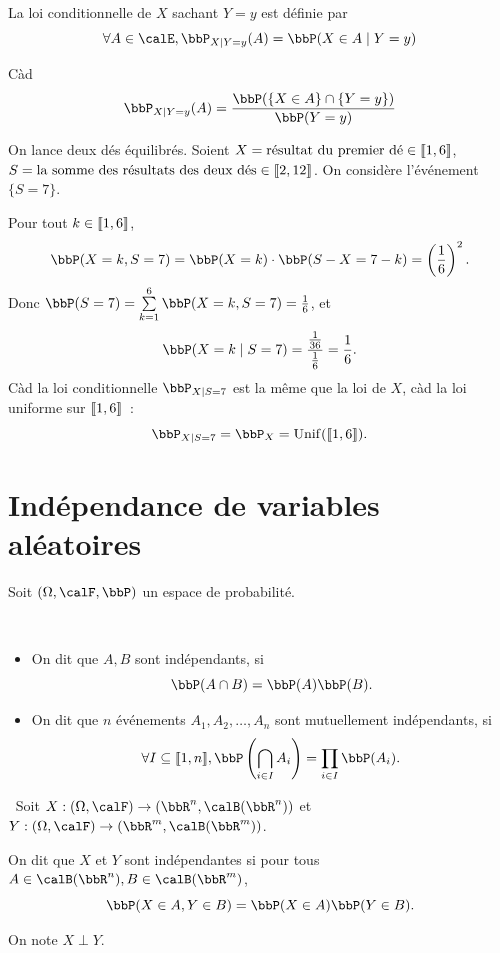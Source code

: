 \begin{deff}
    La loi conditionnelle de $X$ sachant $Y = y$ est définie par
    \[ \forall A \in \calE, \bbP_{X \mid Y = y}(A) = \bbP(X \in A \mid Y = y) \]
\end{deff}

\begin{rqq}
    Càd
    \[ \bbP_{X \mid Y = y}(A) = \frac{\bbP(\{ X \in A \} \cap \{ Y = y \})}{\bbP(Y = y)} \]
\end{rqq}

\begin{exem}
    On lance deux dés équilibrés.
    Soient $X = \text{résultat du premier dé} \in \llbracket 1, 6 \rrbracket$,
    $S = \text{la somme des résultats des deux dés} \in \llbracket 2, 12 \rrbracket$.
    On considère l'événement $\{ S = 7 \}$.

    Pour tout $k \in \llbracket 1, 6 \rrbracket$,
    \[ \bbP(X = k, S = 7) = \bbP(X = k) \cdot \bbP(S - X = 7 - k) = \left(\frac{1}{6}\right)^2. \]
    Donc $\bbP(S = 7) = \sum\limits_{k = 1}^6 \bbP(X = k, S = 7) = \frac{1}{6}$, et
    \[ \bbP(X = k \mid S = 7) = \frac{\frac{1}{36}}{\frac{1}{6}} = \frac{1}{6}. \]
    Càd la loi conditionnelle $\bbP_{X \mid S = 7}$ est la même que la loi de $X$,
    càd la loi uniforme sur $\llbracket 1, 6 \rrbracket$~:
    \[ \bbP_{X \mid S = 7} = \bbP_X = \unif(\llb 1, 6 \rrb). \]
\end{exem}

\section{Indépendance de variables aléatoires}

Soit $(\Omega, \calF, \bbP)$ un espace de probabilité.

\begin{deff} $\ $
    \begin{itemize}
        \item On dit que $A, B$ sont indépendants, si
              \[ \bbP(A \cap B) = \bbP(A) \bbP(B). \]
        \item On dit que $n$ événements $A_1, A_2, \ldots, A_n$ sont mutuellement indépendants, si
              \[ \forall I \subseteq \llb 1, n \rrb, \bbP \left(\bigcap_{i \in I} A_i\right) = \prod_{i \in I} \bbP(A_i). \]
    \end{itemize}
\end{deff}

\begin{deff} $\ $
    Soit $X: (\Omega, \calF) \to (\bbR^n, \calB(\bbR^n))$
    et $Y: (\Omega, \calF) \to (\bbR^m, \calB(\bbR^m))$.

    On dit que $X$ et $Y$ sont indépendantes si pour tous $A \in \calB(\bbR^n), B \in \calB(\bbR^m)$,
    \[ \bbP(X \in A, Y \in B) = \bbP(X \in A) \bbP(Y \in B). \]

    On note $X \perp Y$.
\end{deff}

